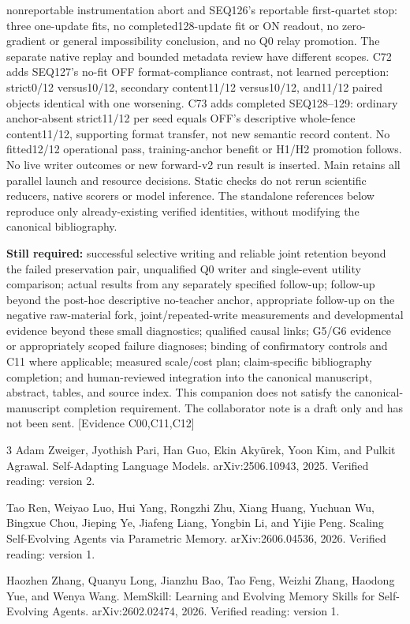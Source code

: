 \documentclass[11pt]{article}
\newcommand{\ev}[1]{\textsf{[Evidence #1]}}
\begin{document}
nonreportable instrumentation abort and SEQ126's reportable first-quartet stop:
three one-update fits, no completed128-update fit or ON readout, no zero-gradient
or general impossibility conclusion, and no Q0 relay promotion. The separate
native replay and bounded metadata review have different scopes. C72 adds
SEQ127's no-fit OFF format-compliance contrast, not learned perception:
strict0/12 versus10/12, secondary content11/12 versus10/12, and11/12 paired
objects identical with one worsening. C73 adds completed SEQ128--129:
ordinary anchor-absent strict11/12 per seed equals OFF's descriptive whole-fence
content11/12, supporting format transfer, not new semantic record content.
No fitted12/12 operational pass, training-anchor benefit or H1/H2 promotion
follows. No live writer outcomes or new forward-v2 run result is inserted.
Main retains all parallel
launch and resource decisions. Static checks do not rerun scientific reducers,
native scorers or model inference.
The standalone references below reproduce only already-existing verified
identities, without modifying the canonical bibliography.

\textbf{Still required:} successful selective writing and reliable joint retention beyond
the failed preservation pair, unqualified Q0 writer and single-event utility
comparison; actual results from any separately specified follow-up; follow-up
beyond the post-hoc descriptive no-teacher anchor,
appropriate follow-up on the negative raw-material fork, joint/repeated-write
measurements and developmental evidence beyond these small diagnostics;
qualified causal links; G5/G6 evidence or appropriately scoped failure diagnoses;
binding of confirmatory controls and C11 where applicable; measured scale/cost
plan; claim-specific bibliography completion; and human-reviewed integration into
the canonical manuscript, abstract, tables, and source index. This companion
does not satisfy the canonical-manuscript completion requirement. The collaborator
note is a draft only and has not been sent. \ev{C00,C11,C12}

\begin{thebibliography}{3}
Adam Zweiger, Jyothish Pari, Han Guo, Ekin Aky\"urek, Yoon Kim, and Pulkit Agrawal.
\newblock Self-Adapting Language Models.
\newblock arXiv:2506.10943, 2025. Verified reading: version 2.

Tao Ren, Weiyao Luo, Hui Yang, Rongzhi Zhu, Xiang Huang, Yuchuan Wu,
Bingxue Chou, Jieping Ye, Jiafeng Liang, Yongbin Li, and Yijie Peng.
\newblock Scaling Self-Evolving Agents via Parametric Memory.
\newblock arXiv:2606.04536, 2026. Verified reading: version 1.

Haozhen Zhang, Quanyu Long, Jianzhu Bao, Tao Feng, Weizhi Zhang,
Haodong Yue, and Wenya Wang.
\newblock MemSkill: Learning and Evolving Memory Skills for Self-Evolving Agents.
\newblock arXiv:2602.02474, 2026. Verified reading: version 1.
\end{thebibliography}
\end{document}

